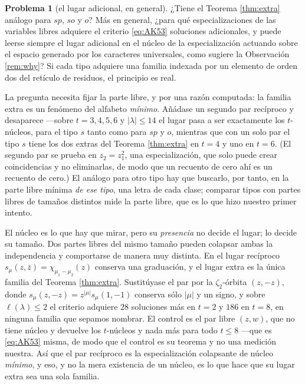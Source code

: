 \documentclass[11pt,reqno]{amsart}
\theoremstyle{plain}
\theoremstyle{definition}
\newtheorem{problem}[theorem]{Problema}
\newcommand{\zb}{\bar z}
\begin{document}
\begin{problem}[el lugar adicional, en general]\label{prob:extralocus}
¿Tiene el Teorema \ref{thm:extra} análogo para $sp$, $so$ y $o$? Más en general, ¿para qué
especializaciones de las variables libres adquiere el criterio \eqref{eq:AK53} soluciones
adicionales, y puede leerse siempre el lugar adicional en el núcleo de la especialización actuando
sobre el espacio generado por los caracteres universales, como sugiere la Observación
\ref{rem:why}? Si cada tipo adquiere una familia indexada por un elemento de orden dos del retículo
de residuos, el principio es real.

La pregunta necesita fijar la parte libre, y por una razón computada: la familia extra es un
fenómeno del alfabeto \emph{mínimo}. Añádase un segundo par recíproco y desaparece ---sobre
$t=3,4,5,6$ y $|\lambda|\le14$ el lugar pasa a ser exactamente los $t$-núcleos, para el tipo $s$
tanto como para $sp$ y $o$, mientras que con un solo par el tipo $s$ tiene los dos extras del Teorema
\ref{thm:extra} en $t=4$ y uno en $t=6$. (El segundo par se prueba en $z_2=z_1^{2}$, una
especialización, que solo puede crear coincidencias y no eliminarlas, de modo que un recuento de cero
ahí es un recuento de cero.) El análogo para otro tipo hay que buscarlo, por tanto, en la parte libre
mínima \emph{de ese tipo}, una letra de cada clase; comparar tipos con partes libres de tamaños
distintos mide la parte libre, que es lo que hizo nuestro primer intento.

El núcleo es lo que hay que mirar, pero su \emph{presencia} no decide el lugar; lo decide su
tamaño. Dos partes libres del mismo tamaño pueden colapsar ambas la independencia y comportarse de
manera muy distinta. En el lugar recíproco $s_\mu(z,\zb)=\chi_{\mu_1-\mu_2}(z)$ conserva una
graduación, y el lugar extra es la única familia del Teorema \ref{thm:extra}. Sustitúyase el par
por la $\zeta_2$-órbita $(z,-z)$, donde $s_\mu(z,-z)=z^{|\mu|}s_\mu(1,-1)$ conserva sólo $|\mu|$ y
un signo, y sobre $\ell(\lambda)\le2$ el criterio adquiere $28$ soluciones más en $t=2$ y $186$ en
$t=8$, en ninguna familia que sepamos nombrar. El control es el par libre $(z,w)$, que no tiene
núcleo y devuelve los $t$-núcleos y nada más para todo $t\le8$ ---que es \eqref{eq:AK53} misma, de
modo que el control es su teorema y no una medición nuestra. Así que el par recíproco es la
especialización colapsante de núcleo \emph{mínimo}, y
eso, y no la mera existencia de un núcleo, es lo que hace que su lugar extra sea una sola familia.
\end{problem}
\end{document}
